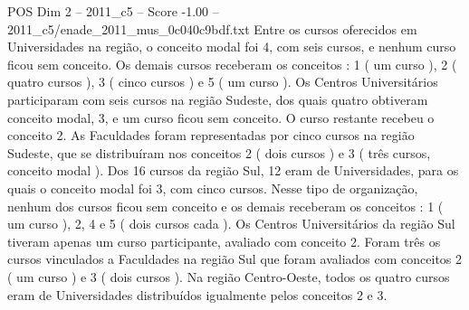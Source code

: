 \begin{textsample}{POS Dim 2 – 2011\_c5 – Score -1.00 – 2011\_c5/enade\_2011\_mus\_0c040c9bdf.txt}
Entre os cursos oferecidos em Universidades na região, o conceito modal foi 4, com seis cursos, e nenhum curso ficou sem conceito.
Os demais cursos receberam os conceitos : 1 ( um curso ), 2 ( quatro cursos ), 3 ( cinco cursos ) e 5 ( um curso ).
Os Centros Universitários participaram com seis cursos na região Sudeste, dos quais quatro obtiveram conceito modal, 3, e um curso ficou sem conceito.
O curso restante recebeu o conceito 2.
As Faculdades foram representadas por cinco cursos na região Sudeste, que se distribuíram nos conceitos 2 ( dois cursos ) e 3 ( três cursos, conceito modal ).
Dos 16 cursos da região Sul, 12 eram de Universidades, para os quais o conceito modal foi 3, com cinco cursos.
Nesse tipo de organização, nenhum dos cursos ficou sem conceito e os demais receberam os conceitos : 1 ( um curso ), 2, 4 e 5 ( dois cursos cada ).
Os Centros Universitários da região Sul tiveram apenas um curso participante, avaliado com conceito 2.
Foram três os cursos vinculados a Faculdades na região Sul que foram avaliados com conceitos 2 ( um curso ) e 3 ( dois cursos ).
Na região Centro-Oeste, todos os quatro cursos eram de Universidades distribuídos igualmente pelos conceitos 2 e 3.

\end{textsample}
